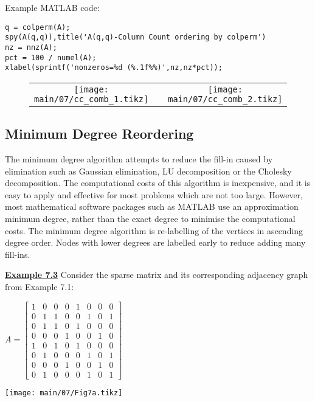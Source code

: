 Example MATLAB code:
\begin{lstlisting}
q = colperm(A);
spy(A(q,q)),title('A(q,q)-Column Count ordering by colperm')
nz = nnz(A);
pct = 100 / numel(A);
xlabel(sprintf('nonzeros=%d (%.1f%%)',nz,nz*pct));
\end{lstlisting}
\begin{figure}[H]
  \begin{center}
    \scriptsize
    \begin{tabular}{ccc}
      \texttt{[image: main/07/cc\_comb\_1.tikz]}
      &&
      \texttt{[image: main/07/cc\_comb\_2.tikz]}
    \end{tabular}
  \end{center}
\end{figure}

\subsection{Minimum Degree Reordering}
The minimum degree algorithm attempts to reduce the fill-in caused by
elimination such as Gaussian elimination, LU decomposition or the Cholesky
decomposition. The computational costs of this algorithm is inexpensive, and it
is easy to apply and effective for most problems which are not too large.
However, most mathematical software packages such as MATLAB use an approximation
minimum degree, rather than the exact degree to minimise the computational costs.
The minimum degree algorithm is re-labelling of the vertices in ascending degree
order. Nodes with lower degrees are labelled early to reduce adding many
fill-ins.

\newpage
{\bf\underline {Example 7.3}}
\vskip 2pt
\noindent
Consider the sparse matrix and its corresponding adjacency graph from Example
7.1:
\noindent
\begin{table}[H]
  \begin{minipage}[]{0.50\linewidth}
    \begin{center}
      $A=
      \begin{bmatrix}
        1 & 0 & 0 & 0 & 1 & 0 & 0 & 0 \\
        0 & 1 & 1 & 0 & 0 & 1 & 0 & 1 \\
        0 & 1 & 1 & 0 & 1 & 0 & 0 & 0 \\
        0 & 0 & 0 & 1 & 0 & 0 & 1 & 0 \\
        1 & 0 & 1 & 0 & 1 & 0 & 0 & 0 \\
        0 & 1 & 0 & 0 & 0 & 1 & 0 & 1 \\
        0 & 0 & 0 & 1 & 0 & 0 & 1 & 0 \\
        0 & 1 & 0 & 0 & 0 & 1 & 0 & 1
     \end{bmatrix}$
    \end{center}
  \end{minipage}
  \begin{minipage}[]{0.49\linewidth}
    \begin{center}
      \texttt{[image: main/07/Fig7a.tikz]}
    \end{center}
  \end{minipage}
\end{table}


